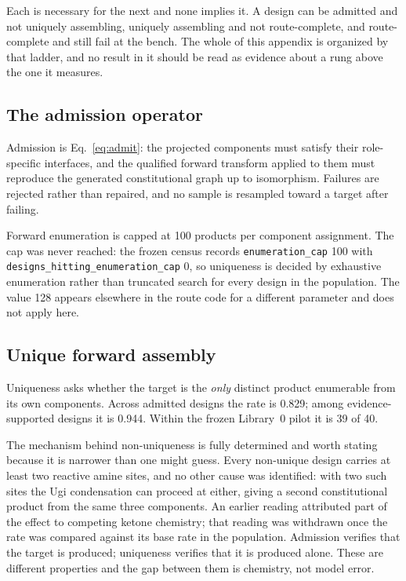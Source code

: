 \documentclass{article}
\newcounter{none}
\newcommand{\UniqueAdmitted}{0.829}
\newcommand{\UniqueSupported}{0.944}
\newcommand{\LibraryZeroN}{40}
\newcommand{\LibraryZeroUnique}{39}
\begin{document}
Each is necessary for the next and none implies it. A design can be admitted and not uniquely
assembling, uniquely assembling and not route-complete, and route-complete and still fail at the
bench. The whole of this appendix is organized by that ladder, and no result in it should be read as
evidence about a rung above the one it measures.

\subsection{The admission operator}
\label{app:admission}
Admission is Eq.~\eqref{eq:admit}: the projected components must satisfy their role-specific
interfaces, and the qualified forward transform applied to them must reproduce the generated
constitutional graph up to isomorphism. Failures are rejected rather than repaired, and no sample is
resampled toward a target after failing.

Forward enumeration is capped at 100 products per component assignment. The cap was never reached:
the frozen census records \texttt{enumeration\_cap} 100 with
\texttt{designs\_hitting\_enumeration\_cap} 0, so uniqueness is decided by exhaustive enumeration
rather than truncated search for every design in the population. The value 128 appears elsewhere in
the route code for a different parameter and does not apply here.

\subsection{Unique forward assembly}
\label{app:unique}
Uniqueness asks whether the target is the \emph{only} distinct product enumerable from its own
components. Across admitted designs the rate is \UniqueAdmitted{}; among evidence-supported designs it
is \UniqueSupported{}. Within the frozen Library~0 pilot it is \LibraryZeroUnique{} of
\LibraryZeroN{}.

The mechanism behind non-uniqueness is fully determined and worth stating because it is narrower than
one might guess. Every non-unique design carries at least two reactive amine sites, and no other cause
was identified: with two such sites the Ugi condensation can proceed at either, giving a second
constitutional product from the same three components. An earlier reading attributed part of the
effect to competing ketone chemistry; that reading was withdrawn once the rate was compared against
its base rate in the population. Admission verifies that the target is produced; uniqueness verifies
that it is produced alone. These are different properties and the gap between them is chemistry, not
model error.
\end{document}
